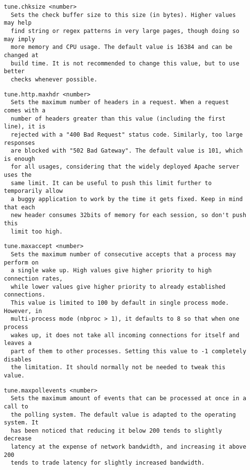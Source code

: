 \begin{verbatim}
tune.chksize <number>
  Sets the check buffer size to this size (in bytes). Higher values may help
  find string or regex patterns in very large pages, though doing so may imply
  more memory and CPU usage. The default value is 16384 and can be changed at
  build time. It is not recommended to change this value, but to use better
  checks whenever possible.
\end{verbatim}

\begin{verbatim}
tune.http.maxhdr <number>
  Sets the maximum number of headers in a request. When a request comes with a
  number of headers greater than this value (including the first line), it is
  rejected with a "400 Bad Request" status code. Similarly, too large responses
  are blocked with "502 Bad Gateway". The default value is 101, which is enough
  for all usages, considering that the widely deployed Apache server uses the
  same limit. It can be useful to push this limit further to temporarily allow
  a buggy application to work by the time it gets fixed. Keep in mind that each
  new header consumes 32bits of memory for each session, so don't push this
  limit too high.
\end{verbatim}

\begin{verbatim}
tune.maxaccept <number>
  Sets the maximum number of consecutive accepts that a process may perform on
  a single wake up. High values give higher priority to high connection rates,
  while lower values give higher priority to already established connections.
  This value is limited to 100 by default in single process mode. However, in
  multi-process mode (nbproc > 1), it defaults to 8 so that when one process
  wakes up, it does not take all incoming connections for itself and leaves a
  part of them to other processes. Setting this value to -1 completely disables
  the limitation. It should normally not be needed to tweak this value.
\end{verbatim}

\begin{verbatim}
tune.maxpollevents <number>
  Sets the maximum amount of events that can be processed at once in a call to
  the polling system. The default value is adapted to the operating system. It
  has been noticed that reducing it below 200 tends to slightly decrease
  latency at the expense of network bandwidth, and increasing it above 200
  tends to trade latency for slightly increased bandwidth.
\end{verbatim}


